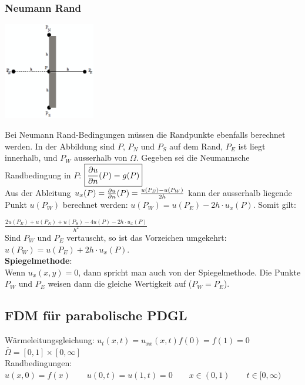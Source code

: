 \subsubsection{Neumann Rand
}
\begin{minipage}{4cm}
	\includegraphics[width=4cm]{Content/02_numerics/NeumannRand.png}
\end{minipage}
\hfill
\begin{minipage}{14cm}
Bei Neumann Rand-Bedingungen müssen die Randpunkte ebenfalls berechnet werden.
In der Abbildung sind $P$, $P_N$ und $P_S$ auf dem Rand,
$P_E$ ist liegt innerhalb, und $P_W$ ausserhalb von $\Omega$.
Gegeben sei  die Neumannsche Randbedingung in $P$: $\boxed{\frac{\partial u}{\partial n}(P)=g(P)}$\\
Aus der Ableitung $u_x(P) = \frac{\partial u}{\partial n}(P) = \frac{u(P_E)-u(P_W)}{2h}$
kann der ausserhalb liegende Punkt $u(P_W)$ berechnet werden: $u(P_W)=u(P_E)-2h\cdot u_x(P)$.
Somit gilt:

$\boxed{\frac{2u(P_E) + u(P_N) +
u(P_S)- 4 u(P) - 2h\cdot u_x(P)}{h^2}}$\\

Sind $P_W$ und $P_E$ vertauscht, so ist das Vorzeichen umgekehrt:
$u(P_W)=u(P_E)+2h\cdot u_x(P)$.\\

\textbf{Spiegelmethode}:\\
Wenn $u_x(x,y) = 0$, dann spricht man auch von der Spiegelmethode. Die Punkte $P_W$ und $P_E$ weisen dann die gleiche Wertigkeit auf ($P_W=P_E$).
\end{minipage}


\subsection{FDM für parabolische PDGL}
	Wärmeleitungsgleichung: $\boxed{u_t(x,t)=u_{xx}(x,t)}$\qquad $f(0)=f(1)=0$ \qquad$ \overset{\_}{\Omega}=[0,1]\times [0,\infty]$\\

	Randbedingungen: $u(x,0)=f(x) \qquad u(0,t)=u(1,t)=0\qquad x\in(0,1) \qquad t\in[0,\infty)$

